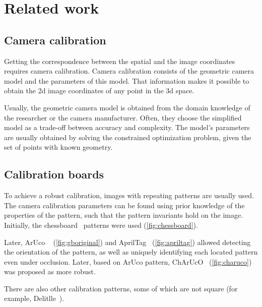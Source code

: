 \chapter{Related work}\label{cha:related_work}

\section{Camera calibration}\label{sub:camera_calibration}

Getting the correspondence between the spatial
and the image coordinates requires camera calibration. Camera
calibration consists of the geometric camera model and the parameters of this
model. That information makes it possible to obtain the 2d image coordinates
of any point in the 3d space.

Usually, the geometric camera model is obtained from the domain knowledge of the
researcher or the camera manufacturer. Often, they choose the simplified model as
a trade-off between accuracy and complexity. The model's parameters are usually
obtained by solving the constrained optimization problem, given the set of
points with known geometry.

\section{Calibration boards}\label{sub:calibration_boards}

To achieve a robust calibration, images with repeating patterns are
usually used. The camera
calibration parameters can be found using prior knowledge of the properties of
the pattern, such that the pattern invariants hold on
the image. Initially, the chessboard~\citep{OpenCVCameraCalibration,
	v.douskosAutomaticCalibrationDigital2007} patterns were used
(\cref{fig:chessboard}).

Later, ArUco
~\citep{garrido-juradoAutomaticGenerationDetection2014} (\cref{fig:gboriginal}) and
AprilTag~\citep{olsonAprilTagRobustFlexible2011} (\cref{fig:apriltag})
allowed detecting the
orientation of the pattern, as well as uniquely identifying each located pattern
even under occlusion. Later, based on ArUco pattern,
ChArUcO~\citep{OpenCVCameraCalibration} (\cref{fig:charuco}) was
proposed as more robust.

There are also other calibration patterns, some of which are not square (for
example, Delitlle~\citep{haDeltilleGridsGeometric2017}).

